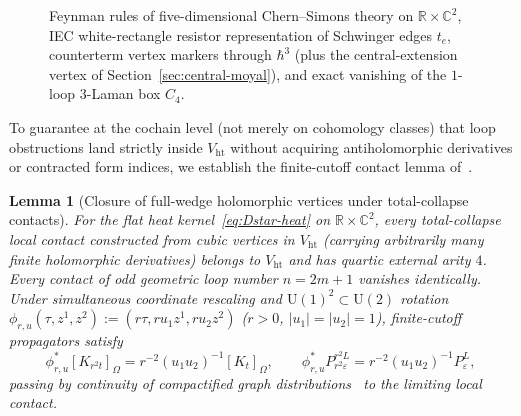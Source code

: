 \documentclass[11pt,letterpaper]{article}
\numberwithin{equation}{section}
\theoremstyle{plain}
\newtheorem{lemma}[theorem]{Lemma}
\theoremstyle{definition}
\theoremstyle{remark}
\newcommand{\Vht}{V_{\mathrm{ht}}}
\begin{document}
\begin{figure}[H]
\caption{Feynman rules of five-dimensional Chern--Simons theory on $\mathbb{R}\times\mathbb{C}^2$, IEC white-rectangle resistor representation of Schwinger edges $t_e$, counterterm vertex markers through $\hbar^3$ (plus the central-extension vertex of Section~\ref{sec:central-moyal}), and exact vanishing of the $1$-loop $3$-Laman box $C_4$.}
\label{fig:feynman-rules-resistor}
\end{figure}

To guarantee at the cochain level (not merely on cohomology classes) that loop obstructions land strictly inside $\Vht$ without acquiring antiholomorphic derivatives or contracted form indices, we establish the finite-cutoff contact lemma of~\cite[Lemma~5.1]{RepoAllOrders}.

\begin{lemma}[Closure of full-wedge holomorphic vertices under total-collapse contacts]
\label{lem:full-wedge-contacts}
For the flat heat kernel~\eqref{eq:Dstar-heat} on $\mathbb{R}\times\mathbb{C}^2$, every total-collapse local contact constructed from cubic vertices in $\Vht$ (carrying arbitrarily many finite holomorphic derivatives) belongs to $\Vht$ and has quartic external arity $4$. Every contact of odd geometric loop number $n = 2m + 1$ vanishes identically. Under simultaneous coordinate rescaling and $\mathrm{U}(1)^2 \subset \mathrm{U}(2)$ rotation $\phi_{r,u}(\tau,z^1,z^2) := (r\tau, r u_1 z^1, r u_2 z^2)$ ($r > 0$, $|u_1|=|u_2|=1$), finite-cutoff propagators satisfy
\begin{equation}
\label{eq:regulated-characters}
\phi_{r,u}^*[K_{r^2 t}]_\Omega = r^{-2}(u_1 u_2)^{-1}[K_t]_\Omega, \qquad
\phi_{r,u}^* P_{r^2\varepsilon}^{r^2 L} = r^{-2}(u_1 u_2)^{-1} P_\varepsilon^L,
\end{equation}
passing by continuity of compactified graph distributions~\cite[Propositions~3.18, 3.21--3.23]{WW} to the limiting local contact.
\end{lemma}
\end{document}
